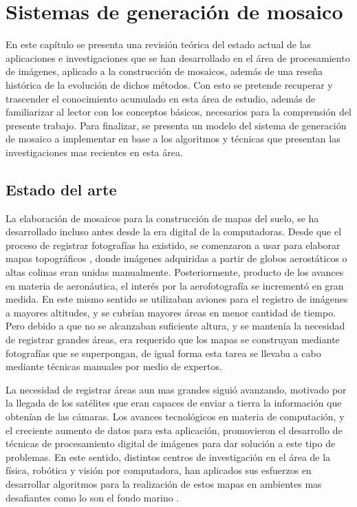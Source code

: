 \chapter{Sistemas de generación de mosaico}
\label{capitulo2}

En este capítulo se presenta una revisión teórica del estado actual de las aplicaciones e investigaciones que se han desarrollado en el área de procesamiento de imágenes, aplicado a la construcción de mosaicos, además de una reseña histórica de la evolución de dichos métodos. Con esto se pretende recuperar y trascender el conocimiento acumulado en esta área de estudio, además de familiarizar al lector con los conceptos básicos, necesarios para la comprensión del presente trabajo. Para finalizar, se presenta un modelo del sistema de generación de mosaico a implementar en base a los algoritmos y técnicas que presentan las investigaciones mas recientes en esta área. 

\section{Estado del arte}

La elaboración de mosaicos para la construcción de mapas del suelo, se ha desarrollado incluso antes desde la era digital de la computadoras. Desde que el proceso de registrar fotografías ha existido, se comenzaron a usar para elaborar mapas topográficos \cite{primeros-mapas}, donde imágenes adquiridas a partir de globos aerostáticos o altas colinas eran unidas manualmente. Posteriormente, producto de los avances en materia de aeronáutica, el interés por la aerofotografía se incrementó en gran medida. En este mismo sentido se utilizaban aviones para el registro de imágenes a mayores altitudes, y se cubrían mayores áreas en menor cantidad de tiempo. Pero debido a que no se alcanzaban suficiente altura, y se mantenía la necesidad de registrar grandes áreas, era requerido que los mapas se construyan mediante fotografías que se superpongan, de igual forma esta tarea se llevaba a cabo mediante técnicas manuales por medio de expertos.

La necesidad de registrar áreas aun mas grandes siguió avanzando, motivado por la llegada de los satélites que eran capaces de enviar a tierra la información que obtenían de las cámaras. Los avances tecnológicos en materia de computación, y el creciente aumento de datos para esta aplicación, promovieron el desarrollo de técnicas de procesamiento digital de imágenes para dar solución a este tipo de problemas. En este sentido, distintos centros de investigación en el área de la física, robótica y visión por computadora, han aplicados sus esfuerzos en desarrollar algoritmos para la realización de estos mapas en ambientes mas desafiantes como lo son el fondo marino \cite{gracias-victor,Pizarro-singh,eustice,Allais}.

